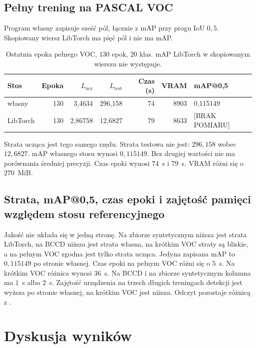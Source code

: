 \subsection{Pełny trening na PASCAL VOC}

Program własny zapisuje sześć pól, łącznie z mAP przy progu IoU \(0{,}5\). Skopiowany wiersz LibTorch ma pięć pól i nie ma mAP.

\begin{table}[ht]
\centering
\caption{Ostatnia epoka pełnego VOC, \(130\) epok, \(20\) klas. mAP LibTorch w skopiowanym wierszu nie występuje.}
\label{tab:voc}
\small
\begin{tabular}{lrrrrrl}
\toprule
Stos & Epoka & \(L_{\mathrm{ucz}}\) & \(L_{\mathrm{test}}\) & Czas (s) & VRAM & mAP@0,5 \\
\midrule
własny & 130 & 3{,}4634 & 296{,}158 & 74 & 8903 & 0{,}115149 \\
LibTorch & 130 & 2{,}86758 & 12{,}6827 & 79 & 8633 & [BRAK POMIARU] \\
\bottomrule
\end{tabular}
\end{table}

Strata ucząca jest tego samego rzędu. Strata testowa nie jest: \(296{,}158\) wobec \(12{,}6827\). mAP własnego stosu wynosi \(0{,}115149\). Bez drugiej wartości nie ma porównania średniej precyzji. Czas epoki wynosi \(74\)~s i \(79\)~s. VRAM różni się o \(270\)~MiB.

\subsection{Strata, mAP@0,5, czas epoki i zajętość pamięci względem stosu referencyjnego}

Jakość nie układa się w jedną stronę. Na zbiorze syntetycznym niższa jest strata LibTorch, na BCCD niższa jest strata własna, na krótkim VOC straty są bliskie, a na pełnym VOC zgodna jest tylko strata ucząca. Jedyna zapisana mAP to \(0{,}115149\) po stronie własnej. Czas epoki na pełnym VOC różni się o \(5\)~s. Na krótkim VOC różnica wynosi \(36\)~s. Na BCCD i na zbiorze syntetycznym kolumna ma \(1\)~s albo \(2\)~s. Zajętość urządzenia na trzech długich treningach detekcji jest wyższa po stronie własnej, na krótkim VOC jest niższa. Odczyt pozostaje różnicą z .

\section{Dyskusja wyników}


